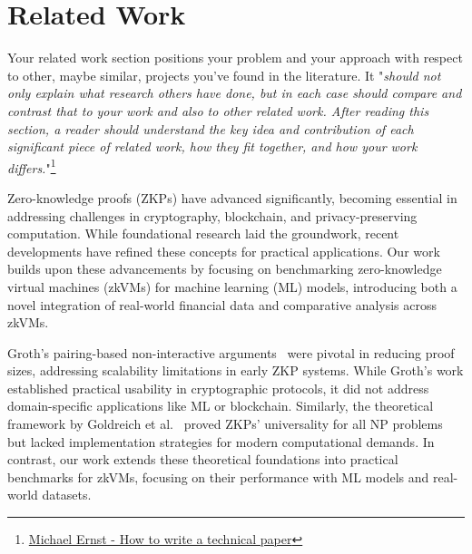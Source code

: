 \documentclass{scrartcl}
\begin{document}
\section{Related Work}

Your related work section positions your problem and your approach with respect to other, maybe similar, projects you've found in the literature. 
It "\textit{should not only explain what research others have done, but in each case should compare and contrast that to your work and also to other related work. After reading this section, a reader should understand the key idea and contribution of each significant piece of related work, how they fit together, and how your work differs.}"\footnote{\href{https://homes.cs.washington.edu/~mernst/advice/write-technical-paper.html\#related-work}{Michael Ernst - How to write a technical paper}} 

Zero-knowledge proofs (ZKPs) have advanced significantly, becoming essential in addressing challenges in cryptography, blockchain, and privacy-preserving computation. While foundational research laid the groundwork, recent developments have refined these concepts for practical applications. Our work builds upon these advancements by focusing on benchmarking zero-knowledge virtual machines (zkVMs) for machine learning (ML) models, introducing both a novel integration of real-world financial data and comparative analysis across zkVMs.

Groth's pairing-based non-interactive arguments~\cite{Groth2016} were pivotal in reducing proof sizes, addressing scalability limitations in early ZKP systems. While Groth's work established practical usability in cryptographic protocols, it did not address domain-specific applications like ML or blockchain. Similarly, the theoretical framework by Goldreich et al.~\cite{Goldreich1991} proved ZKPs' universality for all NP problems but lacked implementation strategies for modern computational demands. In contrast, our work extends these theoretical foundations into practical benchmarks for zkVMs, focusing on their performance with ML models and real-world datasets.
\end{document}
